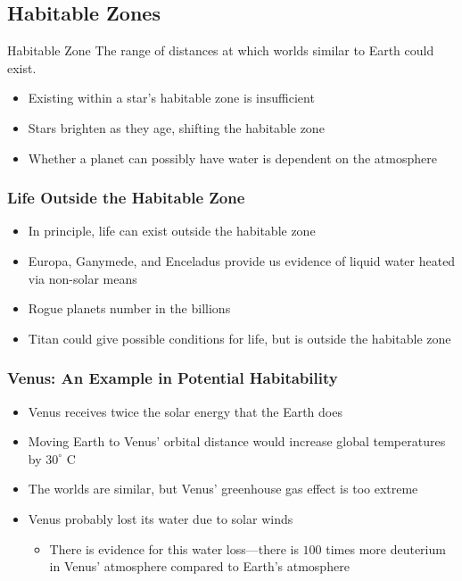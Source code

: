 \documentclass[class=article, crop=false]{standalone}
\begin{document}
  \subsection{Habitable Zones}
  \begin{definition}{Habitable Zone}
    The range of distances at which worlds similar to Earth could exist.
  \end{definition}
  \begin{itemize}
    \item Existing within a star's habitable zone is insufficient
    \item Stars brighten as they age, shifting the habitable zone
    \item Whether a planet can possibly have water is dependent on the atmosphere
  \end{itemize}
  \subsubsection{Life Outside the Habitable Zone}
  \begin{itemize}
    \item In principle, life can exist outside the habitable zone
    \item Europa, Ganymede, and Enceladus provide us evidence of liquid water heated via non-solar means
    \item Rogue planets number in the billions
    \item Titan could give possible conditions for life, but is outside the habitable zone
  \end{itemize}
  \subsubsection{Venus: An Example in Potential Habitability}
  \begin{itemize}
    \item Venus receives twice the solar energy that the Earth does
    \item Moving Earth to Venus' orbital distance would increase global temperatures by $30^\circ$ C
    \item The worlds are similar, but Venus' greenhouse gas effect is too extreme
    \item Venus probably lost its water due to solar winds
    \begin{itemize}
      \item There is evidence for this water loss---there is $100$ times more deuterium in Venus' atmosphere compared to Earth's atmosphere
    \end{itemize}
  \end{itemize}
\end{document}
